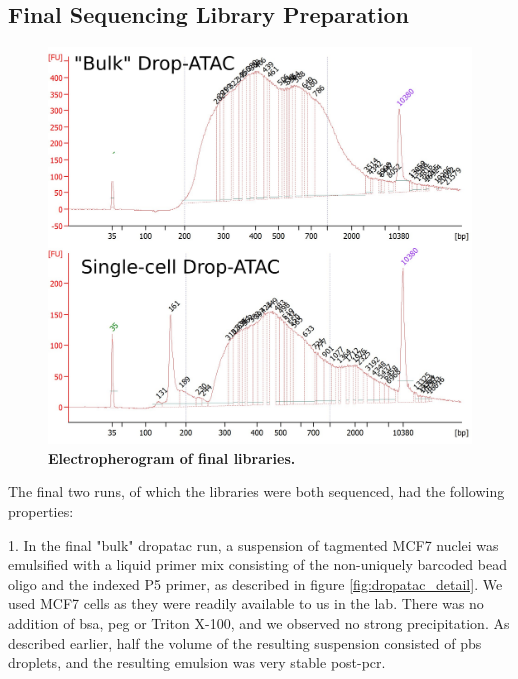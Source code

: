 


\subsection{Final Sequencing Library Preparation}
\begin{figure}
\centering
\includegraphics[width=\textwidth/2]{./ims/dropatac_bioanalyzer.png}
\caption[Electropherogram of final libraries]{\textbf{Electropherogram of final libraries.}}
\label{fig:dropatac_final_electropherogram}
\vspace{-40pt}
\end{figure}

The final two runs, of which the libraries were both sequenced, had the following properties:\pms

1. In the final "bulk" \acrshort{dropatac} run, a suspension of tagmented MCF7 nuclei was emulsified with a liquid primer mix consisting of the non-uniquely barcoded bead oligo and the indexed P5 primer, as described in figure \ref{fig:dropatac_detail}. We used MCF7 cells as they were readily available to us in the lab. There was no addition of \acrshort{bsa}, \acrshort{peg} or Triton X-100, and we observed no strong precipitation. As described earlier, half the volume of the resulting suspension consisted of \acrshort{pbs} droplets, and the resulting emulsion was very stable post-\acrshort{pcr}.\pms

